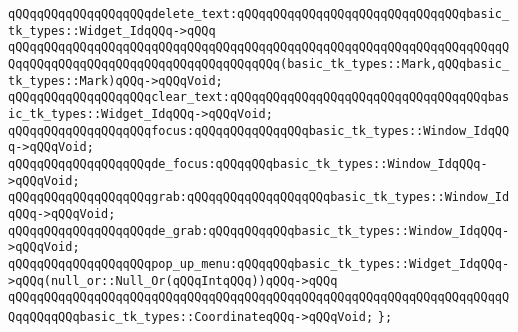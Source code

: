 \verb|qQQqqQQqqQQqqQQqqQQqdelete_text:qQQqqQQqqQQqqQQqqQQqqQQqqQQqqQQqbasic_tk_types::Widget_IdqQQq->qQQq|\newline
\verb|qQQqqQQqqQQqqQQqqQQqqQQqqQQqqQQqqQQqqQQqqQQqqQQqqQQqqQQqqQQqqQQqqQQqqQQqqQQqqQQqqQQqqQQqqQQqqQQqqQQqqQQqqQQq(basic_tk_types::Mark,qQQqbasic_tk_types::Mark)qQQq->qQQqVoid;|\newline
\verb|qQQqqQQqqQQqqQQqqQQqclear_text:qQQqqQQqqQQqqQQqqQQqqQQqqQQqqQQqqQQqbasic_tk_types::Widget_IdqQQq->qQQqVoid;|\newline
\newline
\newline
\verb|qQQqqQQqqQQqqQQqqQQqfocus:qQQqqQQqqQQqqQQqbasic_tk_types::Window_IdqQQq->qQQqVoid;|\newline
\verb|qQQqqQQqqQQqqQQqqQQqde_focus:qQQqqQQqbasic_tk_types::Window_IdqQQq->qQQqVoid;|\newline
\newline
\verb|qQQqqQQqqQQqqQQqqQQqgrab:qQQqqQQqqQQqqQQqqQQqbasic_tk_types::Window_IdqQQq->qQQqVoid;|\newline
\verb|qQQqqQQqqQQqqQQqqQQqde_grab:qQQqqQQqqQQqbasic_tk_types::Window_IdqQQq->qQQqVoid;|\newline
\newline
\verb|qQQqqQQqqQQqqQQqqQQqpop_up_menu:qQQqqQQqbasic_tk_types::Widget_IdqQQq->qQQq(null_or::Null_Or(qQQqIntqQQq))qQQq->qQQq|\newline
\verb|qQQqqQQqqQQqqQQqqQQqqQQqqQQqqQQqqQQqqQQqqQQqqQQqqQQqqQQqqQQqqQQqqQQqqQQqqQQqqQQqbasic_tk_types::CoordinateqQQq->qQQqVoid;|\newline
\verb|};|\newline

